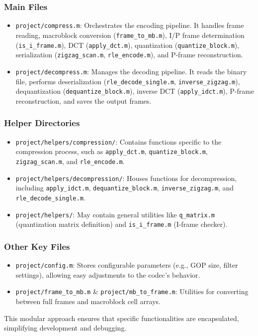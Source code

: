 \documentclass{article}
\begin{document}
\subsubsection{Main Files}
\begin{itemize}
    \item \texttt{project/compress.m}: Orchestrates the encoding pipeline. It handles frame reading, macroblock conversion (\texttt{frame\_to\_mb.m}), I/P frame determination (\texttt{is\_i\_frame.m}), DCT (\texttt{apply\_dct.m}), quantization (\texttt{quantize\_block.m}), serialization (\texttt{zigzag\_scan.m}, \texttt{rle\_encode.m}), and P-frame reconstruction.
    \item \texttt{project/decompress.m}: Manages the decoding pipeline. It reads the binary file, performs deserialization (\texttt{rle\_decode\_single.m}, \texttt{inverse\_zigzag.m}), dequantization (\texttt{dequantize\_block.m}), inverse DCT (\texttt{apply\_idct.m}), P-frame reconstruction, and saves the output frames.
\end{itemize}

\subsubsection{Helper Directories}
\begin{itemize}
    \item \texttt{project/helpers/compression/}: Contains functions specific to the compression process, such as \texttt{apply\_dct.m}, \texttt{quantize\_block.m}, \texttt{zigzag\_scan.m}, and \texttt{rle\_encode.m}.
    \item \texttt{project/helpers/decompression/}: Houses functions for decompression, including \texttt{apply\_idct.m}, \texttt{dequantize\_block.m}, \texttt{inverse\_zigzag.m}, and \texttt{rle\_decode\_single.m}.
    \item \texttt{project/helpers/}: May contain general utilities like \texttt{q\_matrix.m} (quantization matrix definition) and \texttt{is\_i\_frame.m} (I-frame checker).
\end{itemize}

\subsubsection{Other Key Files}
\begin{itemize}
    \item \texttt{project/config.m}: Stores configurable parameters (e.g., GOP size, filter settings), allowing easy adjustments to the codec's behavior.
    \item \texttt{project/frame\_to\_mb.m} & \texttt{project/mb\_to\_frame.m}: Utilities for converting between full frames and macroblock cell arrays.
\end{itemize}
This modular approach ensures that specific functionalities are encapsulated, simplifying development and debugging.
\end{document}
